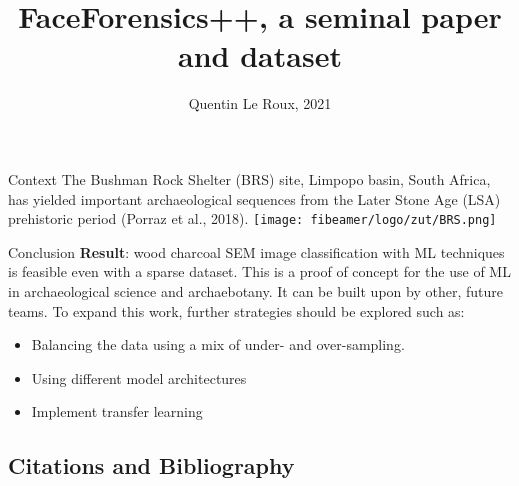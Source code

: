 \documentclass{beamer}
\title{FaceForensics++, a seminal paper and dataset}
\subtitle{Quentin Le Roux, 2021}
\begin{document}
  \frame[c]{\maketitle}

  \begin{darkframes}

    \begin{frame}[label=lists]{Context}
        The Bushman Rock Shelter (BRS) site, Limpopo basin, South Africa, has yielded important 
        archaeological sequences from the Later Stone Age (LSA) prehistoric period (Porraz et al., 2018).\clearpage
        \centering\texttt{[image: fibeamer/logo/zut/BRS.png]}
    \end{frame}

    
    \begin{frame}[label=lists]{Conclusion}
        \textbf{Result}: wood charcoal SEM image classification with ML techniques is feasible even with a sparse dataset.\clearpage
        This is a proof of concept for the use of ML in archaeological science and archaebotany. It can be built upon by other, future teams.
        \clearpage
        To expand this work, further strategies should be explored such as:\begin{itemize}
        \item Balancing the data using a mix of under- and over-sampling.
        \item Using different model architectures
        \item Implement transfer learning
    \end{itemize}

    \end{frame} 

    \subsection{Citations and Bibliography}
    

\end{darkframes}
\end{document}
